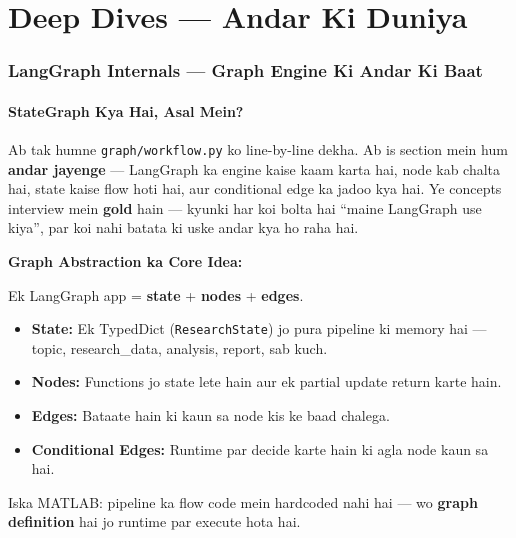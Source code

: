 \newpage

\part{Deep Dives --- Andar Ki Duniya}

\section{LangGraph Internals --- Graph Engine Ki Andar Ki Baat}

\subsection{StateGraph Kya Hai, Asal Mein?}

\begin{storybox}
Ab tak humne \texttt{graph/workflow.py} ko line-by-line dekha. Ab is section mein hum \textbf{andar jayenge} --- LangGraph ka engine kaise kaam karta hai, node kab chalta hai, state kaise flow hoti hai, aur conditional edge ka jadoo kya hai. Ye concepts interview mein \textbf{gold} hain --- kyunki har koi bolta hai ``maine LangGraph use kiya'', par koi nahi batata ki uske andar kya ho raha hai.
\end{storybox}

\begin{conceptbox}
\textbf{Graph Abstraction ka Core Idea:}

Ek LangGraph app = \textbf{state} + \textbf{nodes} + \textbf{edges}.

\begin{itemize}
\item \textbf{State:} Ek TypedDict (\texttt{ResearchState}) jo pura pipeline ki memory hai --- topic, research\_data, analysis, report, sab kuch.
\item \textbf{Nodes:} Functions jo state lete hain aur ek partial update return karte hain.
\item \textbf{Edges:} Bataate hain ki kaun sa node kis ke baad chalega.
\item \textbf{Conditional Edges:} Runtime par decide karte hain ki agla node kaun sa hai.
\end{itemize}

Iska MATLAB: pipeline ka flow code mein hardcoded nahi hai --- wo \textbf{graph definition} hai jo runtime par execute hota hai.
\end{conceptbox}

